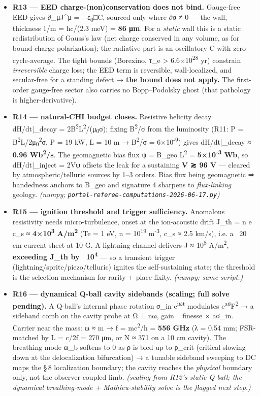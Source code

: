\documentclass[11pt]{article}
\begin{document}
\begin{itemize}
\item \textbf{R13 --- EED charge-(non)conservation does not bind.} Gauge-free EED gives ∂\_μJ\textasciicircum{}μ = −ε\textsubscript{0}□C, sourced only where ∂σ ≠ 0 --- the wall, thickness 1/m = ħc/(2.3 meV) = \textbf{86 μm}. For a \emph{static} wall this is a static redistribution of Gauss's law (net charge conserved in any volume, as for bound-charge polarization); the radiative part is an oscillatory C with zero cycle-average. The tight bounds (Borexino, τ\_e > 6.6×10\textsuperscript{28} yr) constrain \emph{irreversible} charge loss; the EED term is reversible, wall-localized, and secular-free for a standing defect → \textbf{the bound does not apply.} The first-order gauge-free sector also carries no Bopp--Podolsky ghost (that pathology is higher-derivative).
\item \textbf{R14 --- natural-CHI budget closes.} Resistive helicity decay dH/dt|\_decay = 2B\textsuperscript{2}L\textsuperscript{2}/(μ\textsubscript{0}σ); fixing B\textsuperscript{2}/σ from the luminosity (R11: P = B\textsuperscript{2}L/2μ\textsubscript{0}\textsuperscript{2}σ, P = 19 kW, L = 10 m → B\textsuperscript{2}/σ = 6×10\textsuperscript{-9}) gives dH/dt|\_decay ≈ \textbf{0.96 Wb\textsuperscript{2}/s}. The geomagnetic bias flux ψ = B\_geo L\textsuperscript{2} = \textbf{5×10\textsuperscript{-3} Wb}, so dH/dt|\_inject = 2Vψ offsets the leak for a sustaining \textbf{V ≳ 96 V} --- cleared by atmospheric/telluric sources by 1--3 orders. Bias flux being geomagnetic ⇒ handedness anchors to B\_geo and signature 4 sharpens to \emph{flux-linking} geology. \emph{(numpy; \texttt{portal-referee-computations-2026-06-17.py})}
\item \textbf{R15 --- ignition threshold and trigger sufficiency.} Anomalous resistivity needs micro-turbulence, onset at the ion-acoustic drift J\_th = n e c\_s ≈ \textbf{4×10\textsuperscript{3} A/m\textsuperscript{2}} (Te = 1 eV, n = 10\textsuperscript{19} m\textsuperscript{-3}, c\_s ≈ 2.5 km/s), i.e. a ~20 cm current sheet at 10 G. A lightning channel delivers J ≈ 10\textsuperscript{8} A/m\textsuperscript{2}, \textbf{exceeding J\_th by ~10\textsuperscript{4}} --- so a transient trigger (lightning/sprite/piezo/telluric) ignites the self-sustaining state; the threshold is the selection mechanism for rarity + place-fixity. \emph{(numpy; same script.)}
\item \textbf{R16 --- dynamical Q-ball cavity sidebands (scaling; full solve pending).} A Q-ball's internal phase rotation σ\_in e\textsuperscript{iωt} modulates e\textsuperscript{aσ}F\textsuperscript{2} → a sideband comb on the cavity probe at Ω ± nω, gain ~ finesse × aσ\_in. Carrier near the mass: ω ≈ m → f = mc\textsuperscript{2}/h = \textbf{556 GHz} (λ = 0.54 mm; FSR-matched by L = c/2f = 270 μm, or N ≈ 371 on a 10 cm cavity). The breathing mode ω\_b softens to 0 as ρ is bled up to ρ\_crit (critical slowing-down at the delocalization bifurcation) → a tunable sideband sweeping to DC maps the \S\,8 localization boundary; the cavity reaches the \emph{physical} boundary only, not the observer-coupled limb. \emph{(scaling from R12's static Q-ball; the dynamical breathing-mode + Mathieu-stability solve is the flagged next step.)}
\end{itemize}
\end{document}
